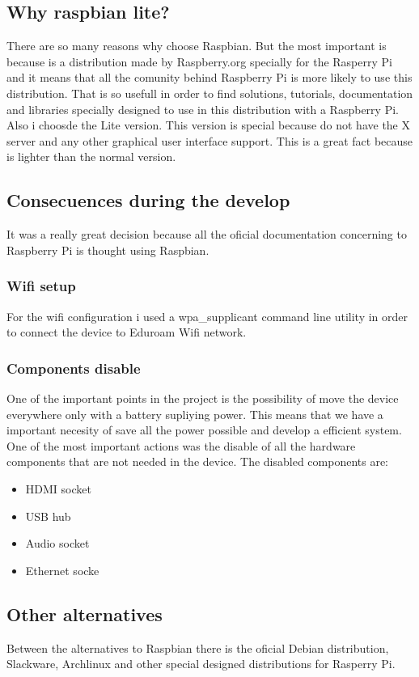 		\subsection{Why raspbian lite?}
		There are so many reasons why choose Raspbian. But the most important is because is a distribution made by Raspberry.org specially for the Rasperry Pi and it means that all the comunity behind Raspberry Pi is more likely to use this distribution. That is so usefull in order to find solutions, tutorials, documentation and libraries specially designed to use in this distribution with a Raspberry Pi.
		Also i choosde the Lite version. This version is special because do not have the X server and any other graphical user interface support. This is a great fact because is lighter than the normal version.
		\subsection{Consecuences during the develop}
		It was a really great decision because all the oficial documentation concerning to Raspberry Pi is thought using Raspbian.
			\subsubsection{Wifi setup} %
			For the wifi configuration i used a wpa\_supplicant command line utility in order to connect the device to Eduroam Wifi network.

			\subsubsection{Components disable}
			One of the important points in the project is the possibility of move the device everywhere only with a battery supliying power. This means that we have a important necesity of save all the power possible and develop a efficient system. One of the most important actions was the disable of all the hardware components that are not needed in the device. The disabled components are:
			\begin{itemize}
				\item HDMI socket
				\item USB hub
				\item Audio socket
				\item Ethernet socke
			\end{itemize}
		\subsection{Other alternatives} %
		Between the alternatives to Raspbian there is the oficial Debian distribution, Slackware, Archlinux and other special designed distributions for Rasperry Pi.
